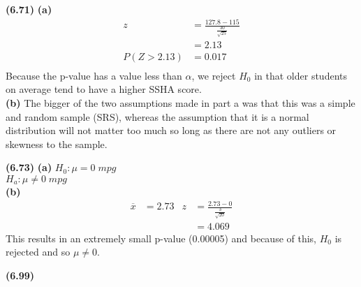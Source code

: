 \documentclass[11pt]{article}
\renewcommand\part[1]{\vspace{.10in}\textbf{(#1)}}
\begin{document}
	\part{6.71}
		\part{a}
			\begin{align*}
				z &= \frac{127.8 - 115}{\frac{30}{\sqrt{25}}}\\
				&= 2.13\\
				P(Z>2.13)&=0.017\\
			\end{align*}
			Because the p-value has a value less than $\alpha$, we reject $H_{0}$ in that older students on average tend to have a higher SSHA score.\\
		\part{b}
			The bigger of the two assumptions made in part a was that this was a simple and random sample (SRS), whereas the assumption that it is a normal distribution will not matter too much so long as there are not any outliers or skewness to the sample.\par
			
	\part{6.73}
		\part{a}
			$H_{0}: \mu = 0 \;mpg$\\
			$H_{a}: \mu \neq 0 \;mpg$\\
		\part{b}
			\begin{align*}
				\overline{x} &= 2.73 		&		z&=\frac{2.73-0}{\frac{3}{\sqrt{20}}} \\
						&			&		&= 4.069
			\end{align*}
			This results in an extremely small p-value (0.00005) and because of this, $H_{0}$ is rejected and so $\mu \neq 0$.\par
			
	\part{6.99}
\end{document}
